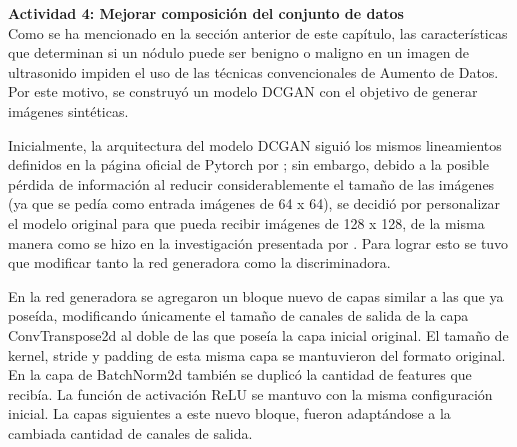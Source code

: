 \textbf{Actividad 4: Mejorar composición del conjunto de datos}
\\
Como se ha mencionado en la sección anterior de este capítulo, las características que determinan si un nódulo puede ser benigno o maligno en un imagen de ultrasonido impiden el uso de las técnicas convencionales de Aumento de Datos. Por este motivo, se construyó un modelo DCGAN con el objetivo de generar imágenes sintéticas.

Inicialmente, la arquitectura del modelo DCGAN siguió los mismos lineamientos definidos en la página oficial de Pytorch por \cite{ws_inkawhich2024dcganpytorch}; sin embargo, debido a la posible pérdida de información al reducir considerablemente el tamaño de las imágenes (ya que se pedía como entrada imágenes de 64 x 64), se decidió por personalizar el modelo original para que pueda recibir imágenes de 128 x 128, de la misma manera como se hizo en la investigación presentada por \cite{pr_JERBI2023autoclassViTGAN}. Para lograr esto se tuvo que modificar tanto la red generadora como la discriminadora.

En la red generadora se agregaron un bloque nuevo de capas similar a las que ya poseída, modificando únicamente el tamaño de canales de salida de la capa ConvTranspose2d al doble de las que poseía la capa inicial original. El tamaño de kernel, stride y padding de esta misma capa se mantuvieron del formato original. En la capa de BatchNorm2d también se duplicó la cantidad de features que recibía. La función de activación ReLU se mantuvo con la misma configuración inicial. La capas siguientes a este nuevo bloque, fueron adaptándose a la cambiada cantidad de canales de salida.

